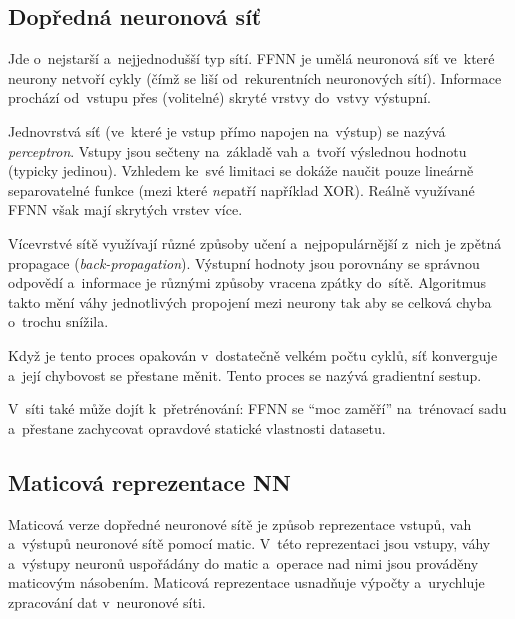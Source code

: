 \subsection{Dopředná neuronová síť}

Jde o~nejstarší a~nejjednodušší typ sítí.
FFNN je umělá neuronová síť ve~které neurony netvoří cykly (čímž se liší od~rekurentních neuronových sítí).
Informace prochází od~vstupu přes (volitelné) skryté vrstvy do~vstvy výstupní.

Jednovrstvá síť (ve~které je vstup přímo napojen na~výstup) se nazývá \emph{perceptron}.
Vstupy jsou sečteny na~základě vah a~tvoří výslednou hodnotu (typicky jedinou).
Vzhledem ke~své limitaci se dokáže naučit pouze lineárně separovatelné funkce (mezi které \emph{ne}patří například XOR).
Reálně využívané FFNN však mají skrytých vrstev více.

Vícevrstvé sítě využívají různé způsoby učení a~nejpopulárnější z~nich je zpětná propagace (\emph{back-propagation}).
Výstupní hodnoty jsou porovnány se správnou odpovědí a~informace je různými způsoby vracena zpátky do~sítě.
Algoritmus takto mění váhy jednotlivých propojení mezi neurony tak aby se celková chyba o~trochu snížila.

Když je tento proces opakován v~dostatečně velkém počtu cyklů, síť konverguje a~její chybovost se přestane měnit.
Tento proces se nazývá gradientní sestup.

V~síti také může dojít k~přetrénování: FFNN se \enquote{moc zaměří} na~trénovací sadu a~přestane zachycovat opravdové statické vlastnosti datasetu.

\subsection{Maticová reprezentace NN}

Maticová verze dopředné neuronové sítě je způsob reprezentace vstupů, vah a~výstupů neuronové sítě pomocí matic. V~této reprezentaci jsou vstupy, váhy a~výstupy neuronů uspořádány do matic a~operace nad nimi jsou prováděny maticovým násobením. Maticová reprezentace usnadňuje výpočty a~urychluje zpracování dat v~neuronové síti.

